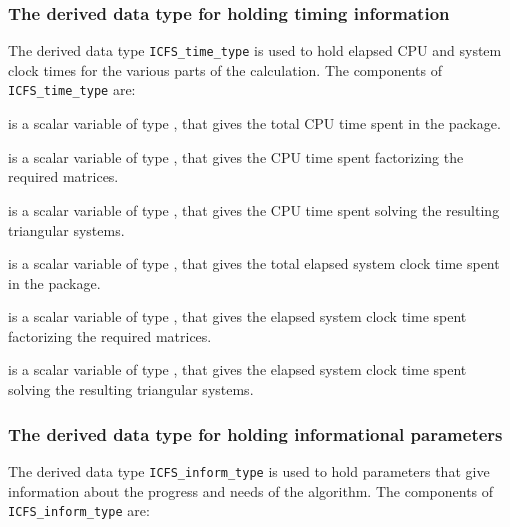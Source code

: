 \documentclass{galahad}
\newcommand{\packagename}{ICFS}
\begin{document}

\subsubsection{The derived data type for holding timing
 information}\label{typetime}
The derived data type
{\tt \packagename\_time\_type}
is used to hold elapsed CPU and system clock times for the various parts of
the calculation. The components of
{\tt \packagename\_time\_type}
are:
\begin{description}
 is a scalar variable of type \realdp, that gives
 the total CPU time spent in the package.

 is a scalar variable of type \realdp, that gives
 the CPU time spent factorizing the required matrices.

 is a scalar variable of type \realdp, that gives
 the CPU time spent solving the resulting triangular systems.

 is a scalar variable of type \realdp, that gives
 the total elapsed system clock time spent in the package.

 is a scalar variable of type \realdp, that gives
 the elapsed system clock time spent factorizing the required matrices.

 is a scalar variable of type \realdp, that gives
 the elapsed system clock time spent solving the resulting triangular systems.

\end{description}


\subsubsection{The derived data type for holding informational
 parameters}\label{typeinform}
The derived data type
{\tt \packagename\_inform\_type}
is used to hold parameters that give information about the progress and needs
of the algorithm. The components of
{\tt \packagename\_inform\_type}
are:
\end{document}
